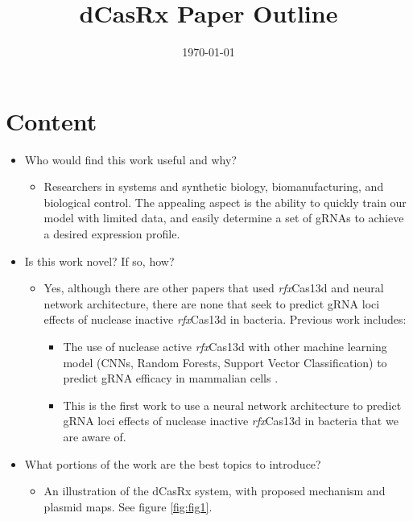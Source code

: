 \documentclass[12pt]{article}
\title{dCasRx Paper Outline}
\date{\today}
\begin{document}
\maketitle

\section*{Content}
\begin{itemize}
    \item Who would find this work useful and why?
    \begin{itemize}
        \item Researchers in systems and synthetic biology, biomanufacturing, and biological control. The appealing aspect is the ability to quickly train our model with limited data, and easily determine a set of gRNAs to achieve a desired expression profile.
    \end{itemize}

    \item Is this work novel? If so, how?
    \begin{itemize}
        \item Yes, although there are other papers that used \textit{rfx}Cas13d and neural network architecture, there are none that seek to predict gRNA loci effects of nuclease inactive \textit{rfx}Cas13d in bacteria. Previous work includes:

        \begin{itemize}
            \item The use of nuclease active \textit{rfx}Cas13d with other machine learning model (CNNs, Random Forests, Support Vector Classification) to predict gRNA efficacy in mammalian cells \textsuperscript{\citep{Wessels2024, Wei2023, Krohannon2022}}.
            \item This is the first work to use a neural network architecture to predict gRNA loci effects of nuclease inactive \textit{rfx}Cas13d in bacteria that we are aware of.
        \end{itemize}
    \end{itemize}

    \item What portions of the work are the best topics to introduce?
    \begin{itemize}
        \item An illustration of the dCasRx system, with proposed mechanism and plasmid maps. See figure \ref{fig:fig1}.


\end{itemize}
\end{itemize}
\end{document}
